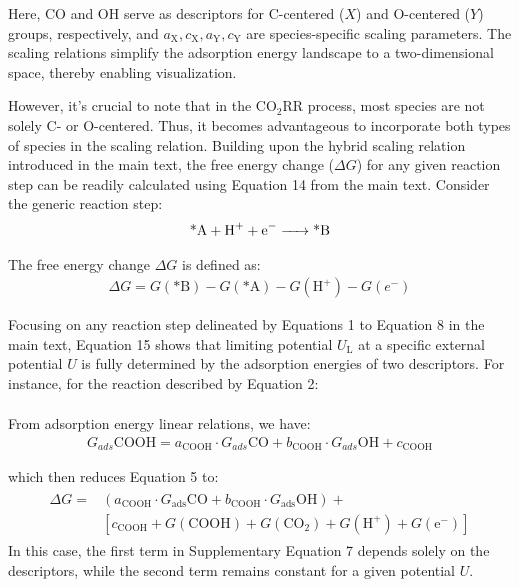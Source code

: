 Here, CO and OH serve as descriptors for C-centered ($X$) and O-centered ($Y$) groups, respectively, and $a_{\mathrm{X}}, c_{\mathrm{X}}, a_{\mathrm{Y}}, c_{\mathrm{Y}}$ are species-specific scaling parameters.
The scaling relations simplify the adsorption energy landscape to a two-dimensional space, thereby enabling visualization.

However, it's crucial to note that in the CO$_2$RR process, most species are not solely C- or O-centered.
Thus, it becomes advantageous to incorporate both types of species in the scaling relation.
Building upon the hybrid scaling relation introduced in the main text, the free energy change ($\Delta\mathit{G}$) for any given reaction step can be readily calculated using Equation 14 from the main text.
Consider the generic reaction step:
\begin{align}
  \ce{\text{*}A + H+ + e- -> \text{*}B}
\end{align}

The free energy change $\Delta\mathit{G}$ is defined as:
\begin{align}
  \Delta G = G(\text{*}\mathrm{B}) - G(\text{*}\mathrm{A}) - G(\mathrm{H}^+) - G(e^-)
\end{align}

Focusing on any reaction step delineated by Equations 1 to Equation 8 in the main text,
Equation 15 shows that limiting potential $U_{\mathrm{L}}$ at a specific external potential $U$ is fully determined by the adsorption energies of two descriptors.
For instance, for the reaction described by Equation 2:
\begin{align}
\end{align}

From adsorption energy linear relations, we have:
\begin{align}
  G_{ads}{\mathrm{COOH}} = a_{\text{COOH}} \cdot G_{ads}{\mathrm{CO}} + b_{\text{COOH}} \cdot G_{ads}{\mathrm{OH}} + c_{\text{COOH}}
\end{align}

which then reduces Equation 5 to:
\begin{align}
  \begin{split}
    \Delta G = &(a_{\text{COOH}} \cdot G_{\text{ads}}{\mathrm{CO}} + b_{\text{COOH}} \cdot G_{\text{ads}}{\mathrm{OH}}) + \\
    &[c_{\text{COOH}} + G(\mathrm{COOH}) + G(\mathrm{CO}_2) + G(\mathrm{H}^+) + G(\mathrm{e}^-)]
  \end{split}
\end{align}
In this case, the first term in Supplementary Equation 7 depends solely on the descriptors, while the second term remains constant for a given potential $U$.


